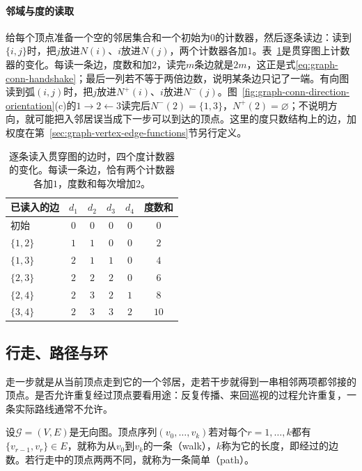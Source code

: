 \paragraph{邻域与度的读取}
给每个顶点准备一个空的邻居集合和一个初始为$0$的计数器，然后逐条读边：读到$\{i,j\}$时，把$j$放进$N(i)$、$i$放进$N(j)$，两个计数器各加$1$。表~\ref{tab:graph-conn-degree-trace}是贯穿图上计数器的变化。每读一条边，度数和加$2$，读完$m$条边就是$2m$，这正是式\eqref{eq:graph-conn-handshake}；最后一列若不等于两倍边数，说明某条边只记了一端。有向图读到弧$(i,j)$时，把$j$放进$N^+(i)$、$i$放进$N^-(j)$。图~\ref{fig:graph-conn-direction-orientation}(c)的$1\to2\leftarrow3$读完后$N^-(2)=\{1,3\}$，$N^+(2)=\varnothing$；不说明方向，就可能把入邻居误当成下一步可以到达的顶点。这里的度只数结构上的边，加权度在第~\ref{sec:graph-vertex-edge-functions}节另行定义。

\begin{table}[!htb]
  \centering
  \caption{逐条读入贯穿图的边时，四个度计数器的变化。每读一条边，恰有两个计数器各加$1$，度数和每次增加$2$。}
  \label{tab:graph-conn-degree-trace}
  \small
  \begin{tabular}{@{}lccccc@{}}
    \toprule
    已读入的边 & $d_1$ & $d_2$ & $d_3$ & $d_4$ & 度数和\\
    \midrule
    初始 & $0$ & $0$ & $0$ & $0$ & $0$\\
    $\{1,2\}$ & $1$ & $1$ & $0$ & $0$ & $2$\\
    $\{1,3\}$ & $2$ & $1$ & $1$ & $0$ & $4$\\
    $\{2,3\}$ & $2$ & $2$ & $2$ & $0$ & $6$\\
    $\{2,4\}$ & $2$ & $3$ & $2$ & $1$ & $8$\\
    $\{3,4\}$ & $2$ & $3$ & $3$ & $2$ & $10$\\
    \bottomrule
  \end{tabular}
\end{table}

\subsection{行走、路径与环}
\label{sec:graph-conn-walks-paths}

走一步就是从当前顶点走到它的一个邻居，走若干步就得到一串相邻两项都邻接的顶点。是否允许重复经过顶点要看用途：反复传播、来回巡视的过程允许重复，一条实际路线通常不允许。

\begin{definition}[行走与路径]
\label{def:graph-conn-walk-path}
设$\mathcal G=(V,E)$是无向图。顶点序列$(v_0,\ldots,v_k)$若对每个$r=1,\ldots,k$都有$\{v_{r-1},v_r\}\in E$，就称为从$v_0$到$v_k$的一条（walk），$k$称为它的长度，即经过的边数。若行走中的顶点两两不同，就称为一条简单（path）。
\end{definition}

